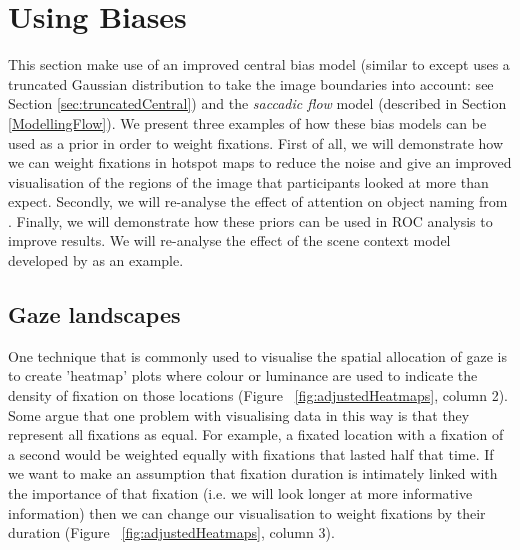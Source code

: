 \section{Using Biases}

This section make use of an improved central bias model (similar to \cite{clarke-tatler2014} except uses a truncated Gaussian distribution to take the image boundaries into account: see Section \ref{sec:truncatedCentral}) and the \textit{saccadic flow} model (described in Section \ref{ModellingFlow}). We present three examples of how these bias models can be used as a prior in order to weight fixations. First of all, we will demonstrate how we can weight fixations in hotspot maps to reduce the noise and give an improved visualisation of the regions of the image that participants looked at more than expect. Secondly, we will re-analyse the effect of attention on object naming from \cite{clarke2013}.  Finally, we will demonstrate how these priors can be used in ROC analysis to improve results. We will re-analyse the effect of the scene context model developed by  \cite{ehinger2009} as an example. 

\subsection{Gaze landscapes}

One technique that is commonly used to visualise the spatial allocation of gaze is to create 'heatmap' plots where colour or luminance are used to indicate the density of fixation on those locations (Figure ~\ref{fig:adjustedHeatmaps}, column 2). Some argue that one problem with visualising data in this way is that they represent all fixations as equal. For example, a fixated location with a fixation of a second would be weighted equally with fixations that lasted half that time. If we want to make an assumption that fixation duration is intimately linked with the importance of that fixation (i.e. we will look longer at more informative information) then we can change our visualisation to weight fixations by their duration (Figure ~\ref{fig:adjustedHeatmaps}, column 3).

